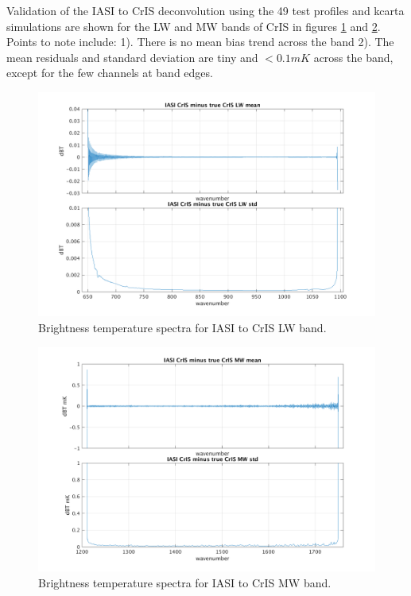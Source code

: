 \documentclass[11pt]{article}
\begin{document}
Validation of the IASI to CrIS deconvolution using the 49 test profiles and kcarta simulations are shown for the LW and MW bands of CrIS in figures \ref{fig:2a} and \ref{fig:2b}. Points to note include: 1). There is no mean bias trend across the band 2). The mean residuals and standard deviation are tiny and $< 0.1 mK $ across the band, except for the few channels at band edges.

\begin{figure}[htb]
\centering
\includegraphics[width=.9\linewidth]{./figs/iasi_cris_diff_LW.png}
\caption{\label{fig:orgparagraph1}
  Brightness temperature spectra for IASI to CrIS LW band.}
\label{fig:2a}
\end{figure}

\begin{figure}[htb]
\centering
\includegraphics[width=.9\linewidth]{./figs/iasi_cris_diff_MW.png}
\caption{\label{fig:orgparagraph1}
  Brightness temperature spectra for IASI to CrIS MW band.}
\label{fig:2b}
\end{figure}
\end{document}
